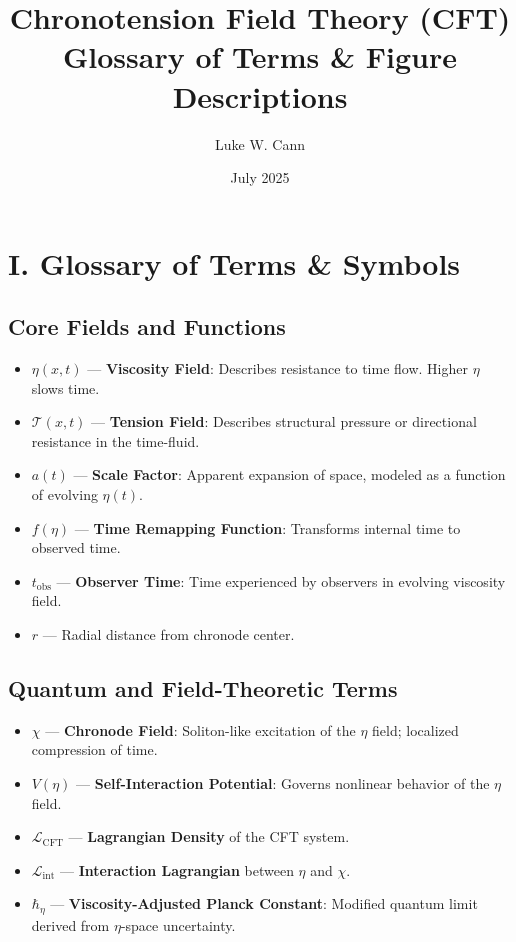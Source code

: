 \documentclass[12pt]{article}
\title{Chronotension Field Theory (CFT)\\Glossary of Terms \& Figure Descriptions}
\author{Luke W. Cann}
\date{July 2025}
\begin{document}
\maketitle

\section*{I. Glossary of Terms \& Symbols}

\subsection*{Core Fields and Functions}
\begin{itemize}
  \item $\eta(x, t)$ — \textbf{Viscosity Field}: Describes resistance to time flow. Higher $\eta$ slows time.
  \item $\mathcal{T}(x, t)$ — \textbf{Tension Field}: Describes structural pressure or directional resistance in the time-fluid.
  \item $a(t)$ — \textbf{Scale Factor}: Apparent expansion of space, modeled as a function of evolving $\eta(t)$.
  \item $f(\eta)$ — \textbf{Time Remapping Function}: Transforms internal time to observed time.
  \item $t_{\text{obs}}$ — \textbf{Observer Time}: Time experienced by observers in evolving viscosity field.
  \item $r$ — Radial distance from chronode center.
\end{itemize}

\subsection*{Quantum and Field-Theoretic Terms}
\begin{itemize}
  \item $\chi$ — \textbf{Chronode Field}: Soliton-like excitation of the $\eta$ field; localized compression of time.
  \item $V(\eta)$ — \textbf{Self-Interaction Potential}: Governs nonlinear behavior of the $\eta$ field.
  \item $\mathcal{L}_{\text{CFT}}$ — \textbf{Lagrangian Density} of the CFT system.
  \item $\mathcal{L}_{\text{int}}$ — \textbf{Interaction Lagrangian} between $\eta$ and $\chi$.
  \item $\hbar_\eta$ — \textbf{Viscosity-Adjusted Planck Constant}: Modified quantum limit derived from $\eta$-space uncertainty.
\end{itemize}
\end{document}
